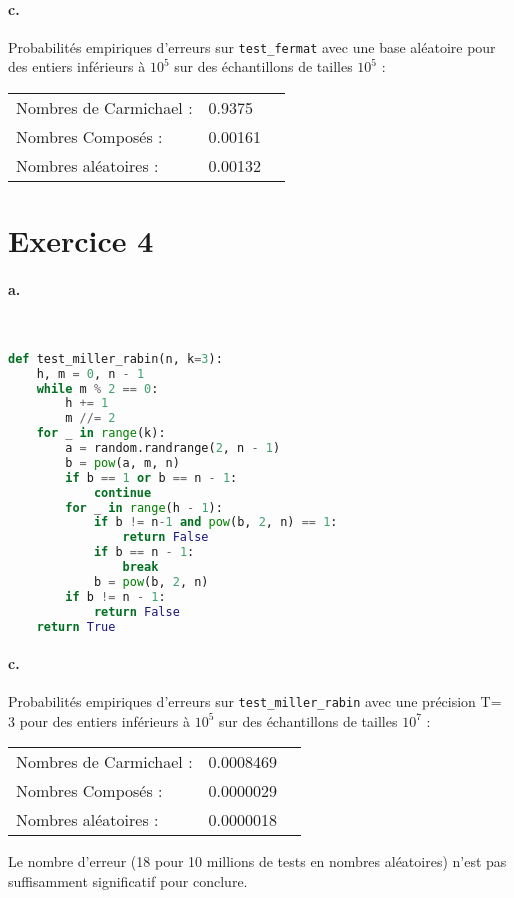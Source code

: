 \documentclass[french]{article}
\begin{document}
\paragraph{c.} Probabilités empiriques d'erreurs sur  \verb|test_fermat| avec une base aléatoire pour des entiers inférieurs à $10^5$ sur des échantillons de tailles $10^5$ :\\
\begin{center}

\begin{tabular}{lll}
    Nombres de Carmichael :&0.9375\\
    Nombres Composés : & 0.00161\\
    Nombres aléatoires : &0.00132\\
\end{tabular}

\end{center}
\section*{Exercice 4}
\paragraph{a.} \
\begin{lstlisting}[language=Python, belowskip=-1 \baselineskip]
def test_miller_rabin(n, k=3):
    h, m = 0, n - 1
    while m % 2 == 0:
        h += 1
        m //= 2
    for _ in range(k):
        a = random.randrange(2, n - 1)
        b = pow(a, m, n)
        if b == 1 or b == n - 1:
            continue
        for _ in range(h - 1):
            if b != n-1 and pow(b, 2, n) == 1:
                return False
            if b == n - 1:
                break
            b = pow(b, 2, n)
        if b != n - 1:
            return False
    return True
\end{lstlisting}
\paragraph{c.} Probabilités empiriques d'erreurs sur  \verb|test_miller_rabin| avec une précision T= 3 pour des entiers inférieurs à $10^5$ sur des échantillons de tailles $10^7$ :\\
\begin{center}
    
    \begin{tabular}{lll}
        Nombres de Carmichael :&0.0008469\\
        Nombres Composés : & 0.0000029\\
        Nombres aléatoires : &0.0000018\\
    \end{tabular}
    
\end{center}
Le nombre d'erreur (18 pour 10 millions de tests en nombres aléatoires) n'est pas suffisamment significatif pour conclure.
\end{document}
